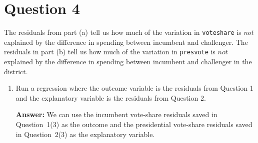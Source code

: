 \documentclass[12pt,letterpaper]{article}
\newcommand{\rcode}[2]{}
\newcommand{\answer}{\par\vspace{.18cm}\noindent\textbf{Answer:} }
\begin{document}
\newpage

\section{Question 4}
\noindent The residuals from part (a) tell us how much of the variation in \texttt{voteshare} is $not$ explained by the difference in spending between incumbent and challenger. The residuals in part (b) tell us how much of the variation in \texttt{presvote} is $not$ explained by the difference in spending between incumbent and challenger in the district.

\begin{enumerate}[(1)]
\setlength{\itemsep}{4pt}\setlength{\parsep}{2pt}
\item Run a regression where the outcome variable is the residuals from Question 1 and the explanatory variable is the residuals from Question 2.

\answer We can use the incumbent vote-share residuals saved in Question~1(3) as the outcome and the presidential vote-share residuals saved in Question~2(3) as the explanatory variable.

\rcode{160}{163}

\par\nobreak
{\footnotesize\setlength{\tabcolsep}{4pt}\renewcommand{\arraystretch}{0.93}%
\noindent{}\par}
\smallskip



\end{enumerate}
\end{document}
